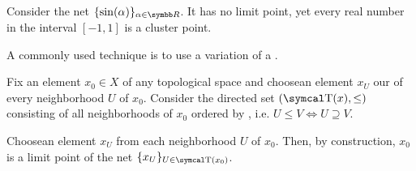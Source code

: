 \begin{example}\label{ex:cluster_points/sine}
  Consider the net \( \{ \sin(\al) \}_{\al \in \BR} \). It has no limit point, yet every real number in the interval \( [-1, 1] \) is a cluster point.
\end{example}

\begin{example}\label{ex:reverse_inclusion_net}
  A commonly used technique is to use a variation of a .

  Fix an element \( x_0 \in X \) of any topological space and choose\LEM an element \( x_U \) our of every neighborhood \( U \) of \( x_0 \). Consider the directed set \( (\CT(x), \leq) \) consisting of all neighborhoods of \( x_0 \) ordered by , i.e. \( U \leq V \iff U \supseteq V \).

  Choose\LEM an element \( x_U \) from each neighborhood \( U \) of \( x_0 \). Then, by construction, \( x_0 \) is a limit point of the net \( \{ x_U \}_{U \in \CT(x_0)} \).
\end{example}

